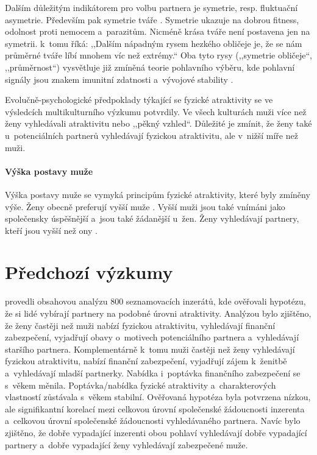 \documentclass[a4paper, 12pt, notitlepage, oneside, numbers=noenddot]{report}
\begin{document}
Dalším důležitým indikátorem pro volbu partnera je symetrie,
resp. fluktuační asymetrie. Především pak symetrie tváře
\citep{Ridley2007}.  Symetrie ukazuje na dobrou fitness, odolnost
proti nemocem a~parazitům.  Nicméně krása tváře není postavena jen na
symetrii. \citet{Ridley2007} k~tomu říká: ,,Dalším nápadným rysem
hezkého obličeje je, že se nám průměrné tváře líbí mnohem víc než
extrémy.`` Oba tyto rysy (,,symetrie obličeje``, ,,průměrnost``)
vysvětluje již zmíněná teorie pohlavního výběru, kde pohlavní signály
jsou znakem imunitní zdatnosti a~vývojové stability \citep{Barber1995}.

Evolučně-psychologické předpoklady týkající se fyzické atraktivity se
ve výsledcích multikulturního výzkumu potvrdily.  Ve všech kulturách
muži více než ženy vyhledávali atraktivitu nebo ,,pěkný vzhled``.
Důležité je zmínit, že ženy také u~potenciálních partnerů
vyhledávají fyzickou atraktivitu, ale v~nižší míře než muži.

\paragraph{Výška postavy muže}

Výška postavy muže se vymyká principům fyzické atraktivity, které byly
zmíněny výše.  Ženy obecně preferují vyšší muže \citep{Barber1995,
  Ridley2007}.  Vyšší muži jsou také vnímáni jako společensky
úspěšnější a~jsou také žádanější u~žen. Ženy vyhledávají partnery,
kteří jsou vyšší než ony \citep{Barber1995}.

\section{Předchozí výzkumy}
\citet{HarrisonSaeed1977} provedli obsahovou analýzu 800 seznamovacích
inzerátů, kde ověřovali hypotézu, že si lidé vybírají partnery na
podobné úrovni atraktivity. Analýzou bylo zjištěno, že ženy častěji
než muži nabízí fyzickou atraktivitu, vyhledávají finanční
zabezpečení, vyjadřují obavy o~motivech potenciálního partnera
a~vyhledávají staršího partnera. Komplementárně k~tomu muži častěji
než ženy vyhledávají fyzickou atraktivitu, nabízí finanční
zabezpečení, vyjadřují zájem k~ženitbě a~vyhledávají mladší
partnerky. Nabídka i~poptávka finančního zabezpečení se s~věkem
měnila. Poptávka/nabídka fy\-zické atraktivity a~charakterových
vlastností zůstávala s~věkem stabilní.  Ověřovaná hypotéza byla
potvrzena nízkou, ale signifikantní korelací mezi celkovou úrovní
společenské žádoucnosti inzerenta a~celkovou úrovní společenské
žádoucnosti vyhledávaného partnera. Navíc bylo zjištěno, že dobře
vypadající inzerenti obou pohlaví vyhledávají dobře vypadající
partnery a~dobře vypadající ženy vyhledávají zabezpečené muže.
\end{document}
